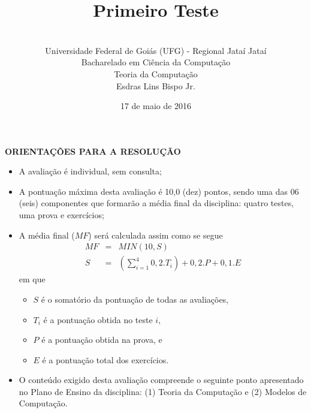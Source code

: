\documentclass[12pt,a4paper,oneside]{article}
\author{\\Universidade Federal de Goiás (UFG) - Regional Jataí Jataí\\Bacharelado em Ciência da Computação \\Teoria da Computação \\Esdras Lins Bispo Jr.}
\date{17 de maio de 2016}
\title{\sc \huge Primeiro Teste}
\begin{document}
\maketitle

{\bf ORIENTAÇÕES PARA A RESOLUÇÃO}

\begin{itemize}
	\item A avaliação é individual, sem consulta;
	\item A pontuação máxima desta avaliação é 10,0 (dez) pontos, sendo uma das 06 (seis) componentes que formarão a média final da disciplina: quatro testes, uma prova e exercícios;
	\item A média final ($MF$) será calculada assim como se segue
	\begin{eqnarray}
		MF & = & MIN(10, S) \nonumber \\
		S & = & (\sum_{i=1}^{4} 0,2.T_i ) + 0,2.P  + 0,1.E \nonumber
	\end{eqnarray}
	em que 
	\begin{itemize}
		\item $S$ é o somatório da pontuação de todas as avaliações,
		\item $T_i$ é a pontuação obtida no teste $i$,
		\item $P$ é a pontuação obtida na prova, e
		\item $E$ é a pontuação total dos exercícios.
	\end{itemize}
	\item O conteúdo exigido desta avaliação compreende o seguinte ponto apresentado no Plano de Ensino da disciplina: (1) Teoria da Computação e (2) Modelos de Computação.
\end{itemize}

\begin{center}
\end{center}

\newpage
\end{document}
